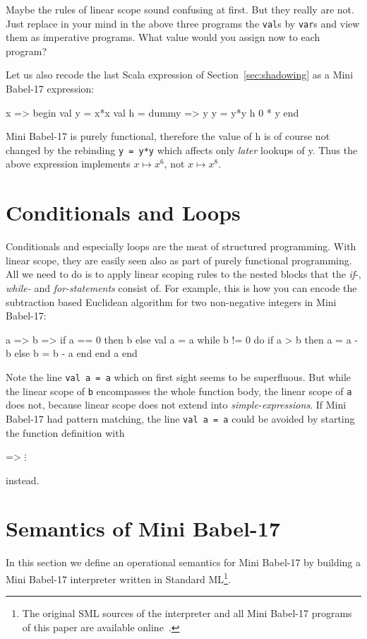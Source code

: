 \documentclass{llncs}
\newcommand{\bsrc}[1] {\lstinline!#1!}
\begin{document}
Maybe the rules of linear scope sound confusing at first. But they really are not. Just replace in your mind in the above three programs the \bsrc{val}s by \bsrc{var}s and view them as imperative programs. What value would you assign now to each program?

Let us also recode the last Scala expression of Section~\ref{sec:shadowing} as a Mini Babel-17 expression:
\begin{babellisting}
x => begin
        val y = x*x
        val h = dummy => y
        y = y*y
        h 0 * y
      end
\end{babellisting} 
Mini Babel-17 is purely functional, therefore the value of h is of course not changed by the rebinding \bsrc{y = y*y} which affects only \emph{later} lookups of y. Thus the above expression implements $x \mapsto x^6$, not $x \mapsto x^8$.

\section{Conditionals and Loops}
Conditionals and especially loops are the meat of structured programming. With linear scope, they are easily seen also as part of purely functional programming. All we need to do is to apply linear scoping rules to the nested blocks that the \emph{if}-, \emph{while-} and \emph{for-statements} consist of. For example, this is how you can encode the subtraction based Euclidean algorithm for two non-negative integers in Mini Babel-17:
\begin{babellisting}
a => b =>
    if a == 0 then
      b
    else 
      val a = a
      while b != 0 do
        if a > b then
          a = a - b
        else
          b = b - a
        end
      end
      a
    end
\end{babellisting}
Note the line \bsrc{val a = a} which on first sight seems to be superfluous. But while the linear scope of \bsrc{b} encompasses the whole
function body, the linear scope of \bsrc{a} does not, because linear scope does not extend into \emph{simple-expressions}.
If Mini Babel-17 had pattern matching, the line \bsrc{val a = a} could be avoided by starting the function definition with 
\begin{babellisting}
[a,  b] =>
    $\vdots$
\end{babellisting}
instead.

\section{Semantics of Mini Babel-17}
In this section we define an operational semantics for Mini Babel-17 by building a Mini Babel-17 interpreter written in Standard ML\footnote{
The original SML sources of the interpreter and all Mini Babel-17 programs of this paper are available online~\cite{babel17}.}. 
\end{document}

